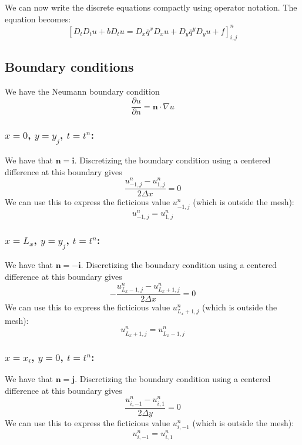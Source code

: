 \documentclass[11pt]{article} %
\newcommand{\dun}{\frac{\partial u}{\partial n}}
\newcommand{\bn}{\mathbf{n}}
\newcommand{\bi}{\mathbf{i}}
\newcommand{\bj}{\mathbf{j}}
\newcommand{\Dx}{\Delta x}
\newcommand{\Dy}{\Delta y}
\begin{document}
We can now write the discrete equations compactly using operator notation. The equation becomes:
\begin{equation}
\left[D_tD_tu + bD_tu = D_x\bar{q}^xD_xu + D_y\bar{q}^yD_yu + f\right]^n_{i,j}
\label{op_not}
\end{equation}

\subsection{Boundary conditions}\label{BC_sec}
We have the Neumann boundary condition
\begin{equation*}
\dun = \bn \cdot \nabla u
\end{equation*}

\subsubsection{ $x=0$, $y = y_j$, $t = t^n$:}
 We have that $\bn = \bi$. Discretizing the boundary condition using a centered difference at this boundary gives
\begin{equation*}
\frac{u^n_{-1,j} - u^n_{1,j}}{2\Dx} = 0
\end{equation*}
We can use this to express the ficticious value $u^n_{-1,j}$ (which is outside the mesh):
\begin{equation}
u^n_{-1,j} = u^n_{1,j}
\label{bc_x0}
\end{equation}

\subsubsection{ $x=L_x$, $y = y_j$, $t = t^n$:}
 We have that $\bn = -\bi$. Discretizing the boundary condition using a centered difference at this boundary gives
\begin{equation*}
-\frac{u^n_{L_x-1,j} - u^n_{L_x+1,j}}{2\Dx} = 0
\end{equation*}
We can use this to express the ficticious value $u^n_{L_x+1,j}$ (which is outside the mesh):
\begin{equation}
u^n_{L_x+1,j} = u^n_{L_x-1,j}
\label{bc_xL}
\end{equation}

\subsubsection{ $x=x_i$, $y = 0$, $t = t^n$:}
 We have that $\bn = \bj$. Discretizing the boundary condition using a centered difference at this boundary gives
\begin{equation*}
\frac{u^n_{i,-1} - u^n_{i,1}}{2\Dy} = 0
\end{equation*}
We can use this to express the ficticious value $u^n_{i,-1}$ (which is outside the mesh):
\begin{equation}
u^n_{i,-1} = u^n_{i,1}
\label{bc_y0}
\end{equation}
\end{document}
